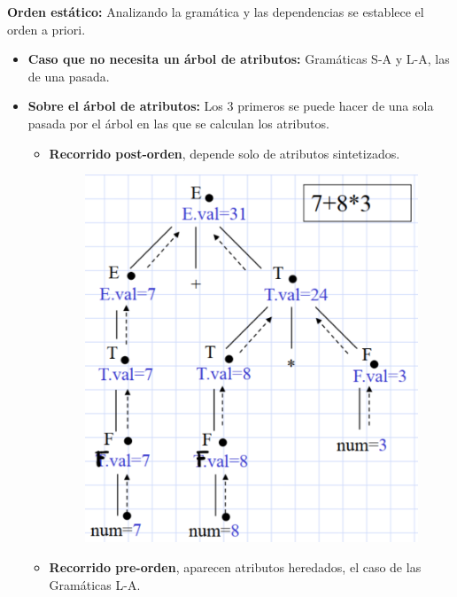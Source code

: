 \documentclass[12pt]{report} %
\begin{document}
\textbf{Orden estático:} Analizando la gramática y las dependencias se establece el orden a priori.
  \begin{itemize}
    \item \textbf{Caso que no necesita un árbol de atributos:} Gramáticas S-A y L-A, las de una pasada.
    \item \textbf{Sobre el árbol de atributos:} Los 3 primeros se puede hacer de una sola pasada por el árbol en las que se calculan los atributos.
    \begin{itemize}
      \item \textbf{Recorrido post-orden}, depende solo de atributos sintetizados.
      \begin{figure}[H]
        {\includegraphics[scale=.25]{2021-05-01 01_50_04-05_resum_Sem_2021.pdf - Foxit Reader.png}}
      \end{figure}
      \item \textbf{Recorrido pre-orden}, aparecen atributos heredados, el caso de las Gramáticas L-A.
      \begin{figure}[H]

\end{figure}
\end{itemize}
\end{itemize}
\end{document}
